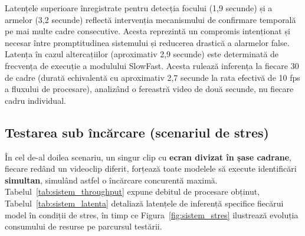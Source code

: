 \documentclass[../../main.tex]{subfiles}
\begin{document}
Latențele superioare înregistrate pentru detecția focului (1,9 secunde) și a armelor (3,2 secunde) reflectă intervenția mecanismului de confirmare temporală pe mai multe cadre consecutive. Acesta reprezintă un compromis intenționat și necesar între promptitudinea sistemului și reducerea drastică a alarmelor false. Latența în cazul altercațiilor (aproximativ 2,9 secunde) este determinată de frecvența de execuție a modulului SlowFast. Acesta rulează inferența la fiecare 30 de cadre (durată echivalentă cu aproximativ 2,7 secunde la rata efectivă de 10 fps a fluxului de procesare), analizând o fereastră video de două secunde, nu fiecare cadru individual.

\subsection{Testarea sub încărcare (scenariul de stres)}
\label{subsec:sistem_stres}

În cel de-al doilea scenariu, un singur clip cu \textbf{ecran divizat în șase cadrane}, fiecare redând un videoclip diferit, forțează toate modelele să execute identificări \textbf{simultan}, simulând astfel o încărcare concurentă maximă. Tabelul~\ref{tab:sistem_throughput} expune debitul de procesare obținut, Tabelul~\ref{tab:sistem_latenta} detaliază latențele de inferență specifice fiecărui model în condiții de stres, în timp ce Figura~\ref{fig:sistem_stres} ilustrează evoluția consumului de resurse pe parcursul testării.
\end{document}
